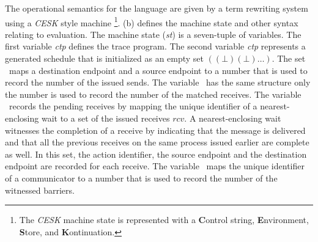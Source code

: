The operational semantics for the language are given by a term rewriting system using a \textit{CESK} style machine \footnote{The \textit{CESK} machine state is represented with a \textbf{C}ontrol string, \textbf{E}nvironment, \textbf{S}tore, and \textbf{K}ontinuation.}. (b) defines the machine state and other syntax relating to evaluation. The machine state (\textit{st}) is a seven-tuple of variables. The first variable \textit{ctp} defines the trace program. The second variable \textit{ctp} represents a generated schedule that is initialized as an empty set $((\bot) (\bot) \ldots)$. The set \epsnd\ maps a destination endpoint and a source endpoint to a number that is used to record the number of the issued sends. The variable \eprcv\ has the same structure only the number is used to record the number of the matched receives. The variable \epwait\ records the pending receives by mapping the unique identifier of a nearest-enclosing wait to a set of the issued receives $\mathit{rcv}$. A nearest-enclosing wait witnesses the completion of a receive by indicating that the message is delivered and that all the previous receives on the same process issued earlier are complete as well. In this set, the action identifier, the source endpoint and the destination endpoint are recorded for each receive. The variable \epbarrier\ maps the unique identifier of a communicator to a number that is used to record the number of the witnessed barriers.
